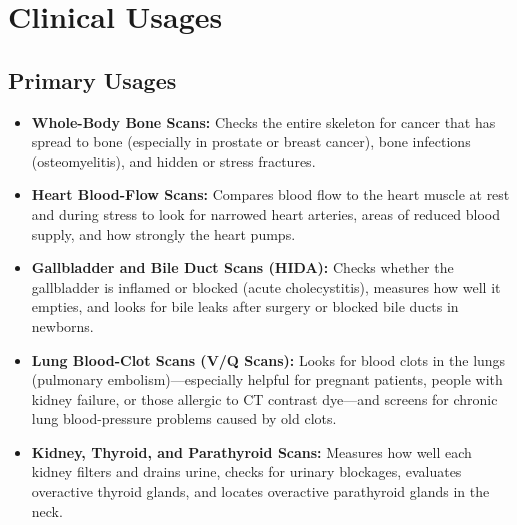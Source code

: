 \section{Clinical Usages}

\subsection{Primary Usages}
\begin{itemize}
\item \textbf{Whole-Body Bone Scans:} Checks the entire skeleton for cancer that has spread to bone (especially in prostate or breast cancer), bone infections (osteomyelitis), and hidden or stress fractures.
\item \textbf{Heart Blood-Flow Scans:} Compares blood flow to the heart muscle at rest and during stress to look for narrowed heart arteries, areas of reduced blood supply, and how strongly the heart pumps.
\item \textbf{Gallbladder and Bile Duct Scans (HIDA):} Checks whether the gallbladder is inflamed or blocked (acute cholecystitis), measures how well it empties, and looks for bile leaks after surgery or blocked bile ducts in newborns.
\item \textbf{Lung Blood-Clot Scans (V/Q Scans):} Looks for blood clots in the lungs (pulmonary embolism)---especially helpful for pregnant patients, people with kidney failure, or those allergic to CT contrast dye---and screens for chronic lung blood-pressure problems caused by old clots.
\item \textbf{Kidney, Thyroid, and Parathyroid Scans:} Measures how well each kidney filters and drains urine, checks for urinary blockages, evaluates overactive thyroid glands, and locates overactive parathyroid glands in the neck.
\end{itemize}

